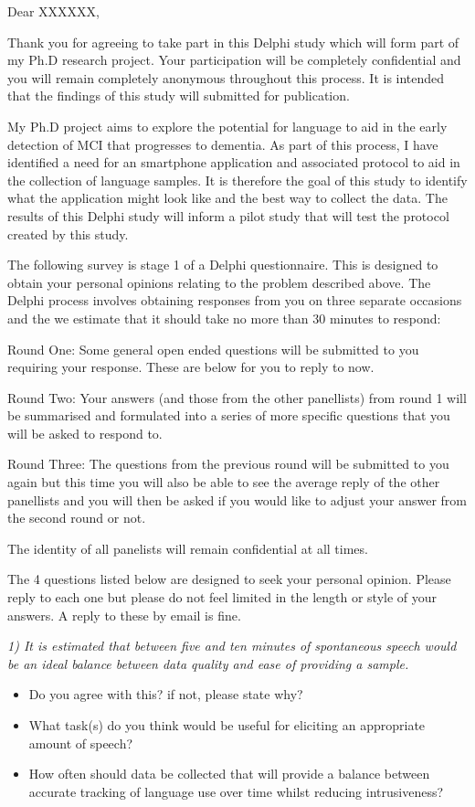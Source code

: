 \documentclass{article}
\begin{document}
Dear XXXXXX, 

Thank you for agreeing to take part in this Delphi study which will form part of my Ph.D research project. Your participation will be completely confidential and you will remain completely anonymous throughout this process. It is intended that the findings of this study will submitted for publication. 

My Ph.D project aims to explore the potential for language to aid in the early detection of MCI that progresses to dementia. As part of this process, I have identified a need for an smartphone application and associated protocol to aid in the collection of language samples. It is therefore the goal of this study to identify what the application might look like and the best way to collect the data. The results of this Delphi study will inform a pilot study that will test the protocol created by this study.

The following survey is stage 1 of a Delphi questionnaire. This is designed to obtain your personal opinions relating to the problem described above. The Delphi process involves obtaining responses from you on three separate occasions and the we estimate that it should take no more than 30 minutes to respond:

Round One: Some general open ended questions will be submitted to you requiring your response. These are below for you to reply to now. 

Round Two: Your answers (and those from the other panellists) from round 1 will be summarised and formulated into a series of more specific questions that you will be asked to respond to.

Round Three: The questions from the previous round will be submitted to you again but this time you will also be able to see the average reply of the other panellists and you will then be asked if you would like to adjust your answer from the second round or not. 

The identity of all panelists will remain confidential at all times.

The 4 questions listed below are designed to seek your personal opinion. Please reply to each one but please do not feel limited in the length or style of your answers. A reply to these by email is fine.
\par
\itshape
1) It is estimated that between five and ten minutes of spontaneous speech would be an ideal balance between data quality and ease of providing a sample. 
\begin{itemize}
	\item Do you agree with this? if not, please state why?
	\item What task(s) do you think would be useful for eliciting an appropriate amount of speech?
	\item How often should data be collected that will provide a balance between accurate tracking of language use over time whilst reducing intrusiveness?
\end{itemize}
\end{document}
